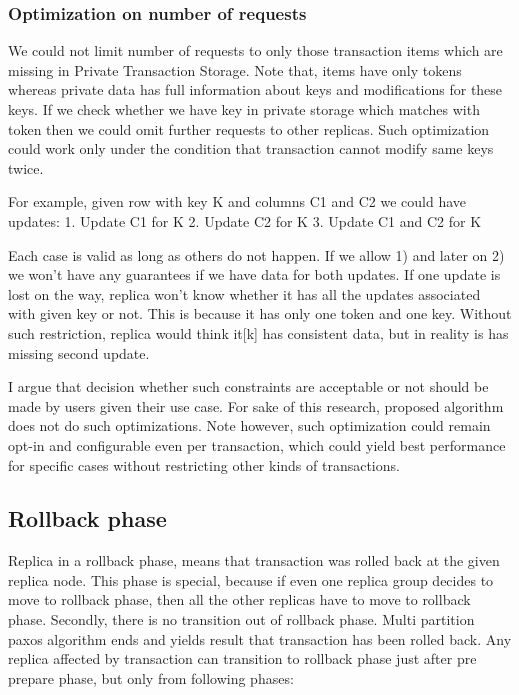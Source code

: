 \subsubsection{Optimization on number of requests}
We could not limit number of requests to only those transaction items which are missing in Private Transaction Storage. Note that, items have only tokens whereas private data has full information about keys and modifications for these keys. If we check whether we have key in private storage which matches with token then we could omit further requests to other replicas. 
Such optimization could work only under the condition that transaction cannot modify same keys twice. 


For example, given row with key K and columns C1 and C2 we could have updates:
1. Update C1 for K
2. Update C2 for K
3. Update C1 and C2 for K


Each case is valid as long as others do not happen. If we allow 1) and later on 2) we won’t have any guarantees if we have data for both updates. If one update is lost on the way, replica won’t know whether it has all the updates associated with given key or not. This is because it has only one token and one key. 
Without such restriction, replica would think it[k] has consistent data, but in reality is has missing second update.

 I argue that decision whether such constraints are acceptable or not should be made by users given their use case. For sake of this research, proposed algorithm does not do such optimizations. Note however, such optimization could remain opt-in and configurable even per transaction, which could yield best performance for specific cases without restricting other kinds of transactions.
       

\subsection{Rollback phase}
Replica in a rollback phase, means that transaction was rolled back at the given replica node. 
This phase is special, because if even one replica group decides to move to rollback phase, then all the other replicas have to move to rollback phase. Secondly, there is no transition out of rollback phase. Multi partition paxos algorithm ends and yields result that transaction has been rolled back.
Any replica affected by transaction can transition to rollback phase just after pre prepare phase, but only from following phases:

